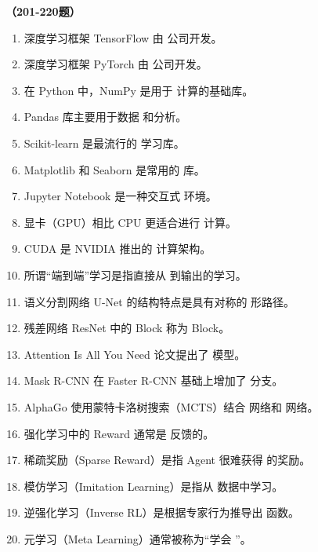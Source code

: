 \vspace{1em}
\textbf{（201-220题）}
\begin{enumerate}[resume,leftmargin=2em,itemsep=1pt]
\item 深度学习框架 TensorFlow 由 \underline{\hspace{3em}} 公司开发。
\item 深度学习框架 PyTorch 由 \underline{\hspace{3em}} 公司开发。
\item 在 Python 中，NumPy 是用于 \underline{\hspace{3em}} 计算的基础库。
\item Pandas 库主要用于数据 \underline{\hspace{3em}} 和分析。
\item Scikit-learn 是最流行的 \underline{\hspace{3em}} 学习库。
\item Matplotlib 和 Seaborn 是常用的 \underline{\hspace{3em}} 库。
\item Jupyter Notebook 是一种交互式 \underline{\hspace{3em}} 环境。
\item 显卡（GPU）相比 CPU 更适合进行 \underline{\hspace{3em}} 计算。
\item CUDA 是 NVIDIA 推出的 \underline{\hspace{3em}} 计算架构。
\item 所谓“端到端”学习是指直接从 \underline{\hspace{3em}} 到输出的学习。
\item 语义分割网络 U-Net 的结构特点是具有对称的 \underline{\hspace{3em}} 形路径。
\item 残差网络 ResNet 中的 Block 称为 \underline{\hspace{3em}} Block。
\item Attention Is All You Need 论文提出了 \underline{\hspace{3em}} 模型。
\item Mask R-CNN 在 Faster R-CNN 基础上增加了 \underline{\hspace{3em}} 分支。
\item AlphaGo 使用蒙特卡洛树搜索（MCTS）结合 \underline{\hspace{3em}} 网络和 \underline{\hspace{3em}} 网络。
\item 强化学习中的 Reward 通常是 \underline{\hspace{3em}} 反馈的。
\item 稀疏奖励（Sparse Reward）是指 Agent 很难获得 \underline{\hspace{3em}} 的奖励。
\item 模仿学习（Imitation Learning）是指从 \underline{\hspace{3em}} 数据中学习。
\item 逆强化学习（Inverse RL）是根据专家行为推导出 \underline{\hspace{3em}} 函数。
\item 元学习（Meta Learning）通常被称为“学会 \underline{\hspace{3em}}”。
\end{enumerate}

